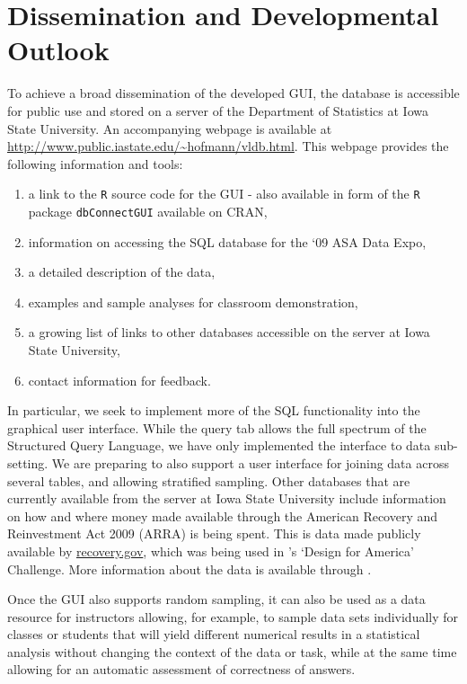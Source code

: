 \documentclass[11pt]{tise_style}
\begin{document}

\section{{Dissemination and Developmental Outlook}}
To achieve a broad dissemination of the developed GUI, the database is accessible for public use and stored on a server of the Department of Statistics at Iowa State University. An accompanying webpage is available at \url{http://www.public.iastate.edu/~hofmann/vldb.html}.
This webpage provides the following information and tools: 
\begin{enumerate} 
\item a link to the {\tt R} source code for the GUI - also available in form of the {\tt R} package {\tt dbConnectGUI} available on CRAN, 
\item information on accessing the SQL database for the `09 ASA Data Expo, 
\item a detailed description of the data,  
\item examples and sample analyses for classroom demonstration, 
\item a growing list of links to other databases accessible on the server at Iowa State University, 
\item contact information for feedback.
\end{enumerate}
In particular, we seek to implement more of the SQL functionality into the graphical user interface. While the query tab allows the full spectrum of the Structured Query Language, we have only implemented the interface to data sub-setting. We are preparing to also support a user interface for joining data across several tables, and allowing stratified sampling. 
Other databases that are currently available from the server at Iowa State University include information on how and where money made available through the American Recovery and Reinvestment Act 2009 (ARRA) is being spent. This is data made publicly available by \url{recovery.gov}, which was being used in \citet{designforamerica}'s `Design for America' Challenge. More information about the data is available through \citet{arra}.

Once the GUI also supports random sampling, it can also be used as a data resource for instructors allowing, for example, to sample data sets individually for classes or students that will yield different numerical results in a statistical analysis without changing the context of the data or task, while at the same time allowing for an automatic assessment of correctness of answers.    
\end{document}
